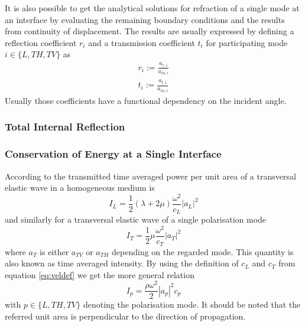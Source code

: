 It is also possible to get the analytical solutions for refraction of a single
mode at an interface by evaluating the remaining boundary conditions and the
results from continuity of displacement. The results are usually expressed by
defining a reflection coefficient $r_i$ and a transmission coefficient $t_i$
for participating mode $i \in\{L, TH, TV\}$ as
\begin{align}
    r_i := \frac{a_{r,i}}{a_{in,i}} \\
    t_i := \frac{a_{t,i}}{a_{in,i}}
\end{align}
Usually those coefficients have a functional dependency on the incident angle.
\subsubsection{Total Internal Reflection}

\subsubsection{Conservation of Energy at a Single Interface}
According to \cite[166]{achenbach1973wave} the transmitted time averaged power
per unit area of a transversal elastic wave in a homogeneous medium is
\begin{equation}
    I_L = \frac{1}{2}(\lambda+2\mu)\frac{\omega^2}{c_L}|a_L|^2
\end{equation}
and similarly for a transversal elastic wave of a single polarisation mode
\begin{equation}
    I_T = \frac{1}{2}\mu\frac{\omega^2}{c_T}|a_T|^2
\end{equation}
where $a_T$ is either $a_{TV}$ or $a_{TH}$ depending on the regarded mode. This
quantity is also known as time averaged intensity. By using the definition of
$c_L$ and $c_T$ from equation \ref{eq:veldef} we get the more general relation
\begin{equation}
    I_p = \frac{\rho\omega^2}{2} |a_p|^2 c_p
\end{equation}
with $p\in \{L,TH, TV\}$ denoting the polarisation mode. It should be noted
that the referred unit area is perpendicular to the direction of propagation.

